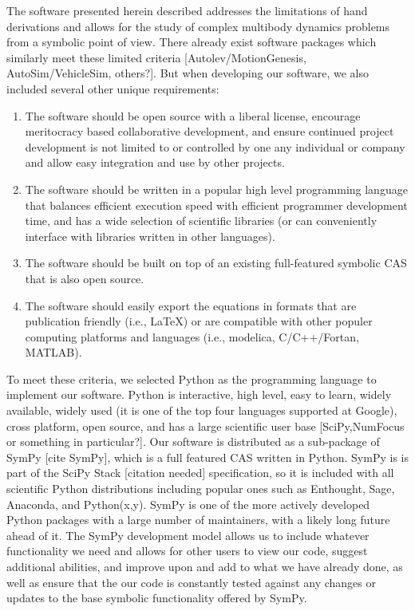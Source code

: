 \documentclass[twocolumn,10pt]{asme2e}
\begin{document}
The software presented herein described addresses the limitations of hand
derivations and allows for the study of complex multibody dynamics problems
from a symbolic point of view. There already exist software packages which
similarly meet these limited criteria [Autolev/MotionGenesis,
AutoSim/VehicleSim, others?]. But when developing our software, we also
included several other unique requirements:
\begin{enumerate}
  \item The software should be open source with a liberal license, encourage
  meritocracy based collaborative development, and ensure continued project
  development is not limited to or controlled by one any individual or company
  and allow easy integration and use by other projects.

  \item The software should be written in a popular high level programming
  language that balances efficient execution speed with efficient programmer
  development time, and has a wide selection of scientific libraries (or can
  conveniently interface with libraries written in other languages).

  \item The software should be built on top of an existing full-featured
  symbolic CAS that is also open source.

  \item The software should easily export the equations in formats that are
  publication friendly (i.e., \LaTeX) or are compatible with other populer
  computing platforms and languages (i.e., modelica, C/C++/Fortan, MATLAB).
\end{enumerate}
To meet these criteria, we selected Python as the programming language to
implement our software.  Python is interactive, high level, easy to learn,
widely available, widely used (it is one of the top four languages supported at
Google), cross platform, open source, and has a large scientific user base
[SciPy,NumFocus or something in particular?].  Our software is distributed as a
sub-package of SymPy [cite SymPy], which is a full featured CAS written in
Python.  SymPy is is part of the SciPy Stack [citation needed] specification,
so it is included with all scientific Python distributions including popular
ones such as Enthought, Sage, Anaconda, and Python(x,y). SymPy is one of the
more actively developed Python packages with a large number of maintainers,
with a likely long future ahead of it. The SymPy development model allows us to
include whatever functionality we need and allows for other users to view our
code, suggest additional abilities, and improve upon and add to what we have
already done, as well as ensure that the our code is constantly tested against
any changes or updates to the base symbolic functionality offered by SymPy.
\end{document}
